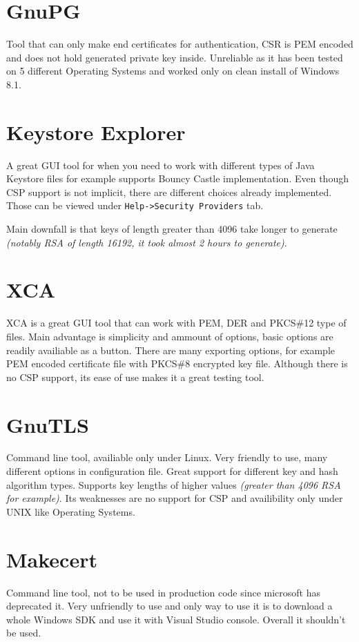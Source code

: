 \documentclass[10pt, a4paper]{report}
\begin{document}
\section{GnuPG}
Tool that can only make end certificates for authentication, CSR is PEM encoded and does not hold generated private key inside. Unreliable as it has been tested on 5 different Operating Systems and worked only on clean install of Windows 8.1.

\section{Keystore Explorer}
A great GUI tool for when you need to work with different types of Java Keystore files for example supports Bouncy Castle implementation. Even though CSP support is not implicit, there are different choices already implemented. Those can be viewed under \verb+Help->Security Providers+ tab.

Main downfall is that keys of length greater than 4096 take longer to generate \textit{(notably RSA of length 16192, it took almost 2 hours to generate)}.

\section{XCA}
XCA is a great GUI tool that can work with PEM, DER and PKCS\#12 type of files. Main advantage is simplicity and ammount of options, basic options are readily availiable as a button. There are many exporting options, for example PEM encoded certificate file with PKCS\#8 encrypted key file. Although there is no CSP support, its ease of use makes it a great testing tool.

\section{GnuTLS}
Command line tool, availiable only under Linux. Very friendly to use, many different options in configuration file. Great support for different key and hash algorithm types. Supports key lengths of higher values \textit{(greater than 4096 RSA for example)}. Its weaknesses are no support for CSP and availibility only under UNIX like Operating Systems.

\section{Makecert}
Command line tool, not to be used in production code since microsoft has deprecated it. Very unfriendly to use and only way to use it is to download a whole Windows SDK and use it with Visual Studio console. Overall it shouldn't be used.
\end{document}
